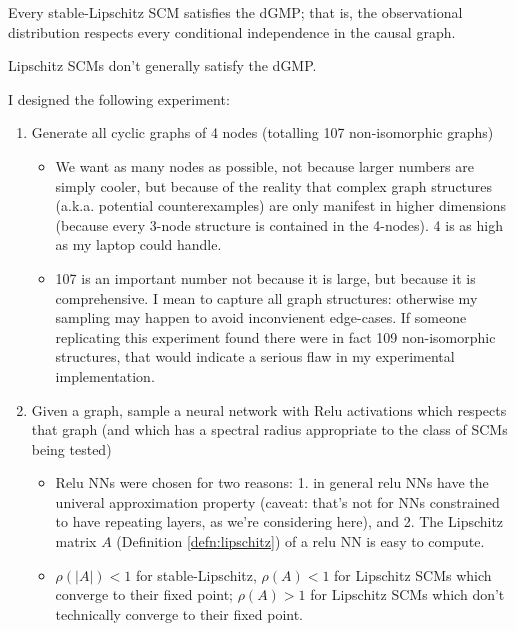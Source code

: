 \documentclass[12pt]{article}
\begin{document}
\begin{conjecture}\label{conj:stable-Lipschitz}
Every stable-Lipschitz SCM satisfies the dGMP; that is, the observational distribution respects every conditional independence in the causal graph.
\end{conjecture}

\begin{conjecture}[Lipschitz]\label{conj:Lipschitz}
Lipschitz SCMs don’t generally satisfy the dGMP.
\end{conjecture}

I designed the following experiment:
\begin{enumerate}
  \item Generate all cyclic graphs of 4 nodes (totalling 107 non-isomorphic graphs)
  \begin{itemize}
  	\item We want as many nodes as possible, not because larger numbers are simply cooler, but because of the reality that complex graph structures (a.k.a. potential counterexamples) are only manifest in higher dimensions (because every 3-node structure is contained in the 4-nodes). 4 is as high as my laptop could handle.
  	\item 107 is an important number not because it is large, but because it is comprehensive. I mean to capture all graph structures: otherwise my sampling may happen to avoid inconvienent edge-cases. If someone replicating this experiment found there were in fact 109 non-isomorphic structures, that would indicate a serious flaw in my experimental implementation.
  \end{itemize}
  \item Given a graph, sample a neural network with Relu activations which respects that graph (and which has a spectral radius appropriate to the class of SCMs being tested)
  \begin{itemize}
  	\item Relu NNs were chosen for two reasons: 1. in general relu NNs have the univeral approximation property (caveat: that's not for NNs constrained to have repeating layers, as we're considering here), and 2. The Lipschitz matrix $A$ (Definition \ref{defn:lipschitz}) of a relu NN is easy to compute.
  	\item $\rho(|A|)<1$ for stable-Lipschitz, $\rho(A)<1$ for Lipschitz SCMs which converge to their fixed point; $\rho(A)>1$ for Lipschitz SCMs which don't technically converge to their fixed point.
  \end{itemize}

\end{enumerate}
\end{document}
